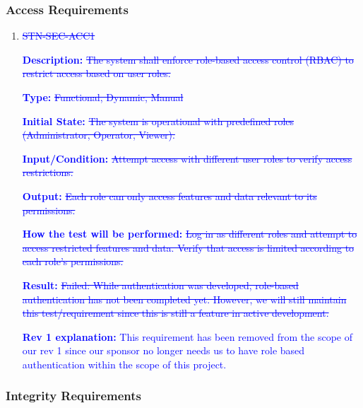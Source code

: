 \documentclass[12pt, titlepage]{article}
\begin{document}
\subsubsection{Access Requirements}

\begin{enumerate}

  \item \textcolor{blue}{\sout{STN-SEC-ACC1\\}}

  \textbf{\textcolor{blue}{Description:}} \textcolor{blue}{\sout{The system shall enforce role-based access control (RBAC) to restrict access based on user roles.}}
  
  \textbf{\textcolor{blue}{Type:}} \textcolor{blue}{\sout{Functional, Dynamic, Manual}}
  
  \textbf{\textcolor{blue}{Initial State:}} \textcolor{blue}{\sout{The system is operational with predefined roles (Administrator, Operator, Viewer).}}
  
  \textbf{\textcolor{blue}{Input/Condition:}} \textcolor{blue}{\sout{Attempt access with different user roles to verify access restrictions.}}
  
  \textbf{\textcolor{blue}{Output:}} \textcolor{blue}{\sout{Each role can only access features and data relevant to its permissions.}}
  
  \textbf{\textcolor{blue}{How the test will be performed:}} \textcolor{blue}{\sout{Log in as different roles and attempt to access restricted features and data. Verify that access is limited according to each role’s permissions.}}
  
  \textbf{\textcolor{blue}{Result:}} \textcolor{blue}{\sout{Failed: While authentication was developed, role-based authentication has not been completed yet. However, we will still maintain this test/requirement since this is still a feature in active development.}}

  \textcolor{blue}{\textbf{Rev 1 explanation:} This requirement has been removed from the scope of our rev 1 since our sponsor no longer needs us to have role based authentication within the scope of this project.}
  


\end{enumerate}

\subsubsection{Integrity Requirements}
\end{document}
